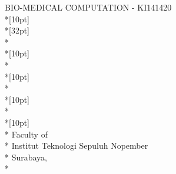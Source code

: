 \newpage

	\sffamily
	\thispagestyle{empty}
	{ \noindent BIO-MEDICAL COMPUTATION - KI141420 }\\*[10pt] 
	{\large\textbf{\MakeUppercase{\judul}}} \\*[32pt]
	\MakeUppercase{\penulisSatu} \\*
	\nrpSatu \\*[10pt]
	\MakeUppercase{\penulisDua} \\*
	\nrpDua \\*[10pt]
	\MakeUppercase{\penulisTiga} \\*
	\nrpTiga \\*[10pt]
	\MakeUppercase{\penulisEmpat} \\*
	\nrpEmpat \\*[10pt]
	\MakeUppercase{\jurusan} \\*
	Faculty of \fakultas \\*
	Institut Teknologi Sepuluh Nopember \\*
	Surabaya, \tahun \\*
	\rmfamily
	\normalsize
	\restoregeometry
	\color{black}
	\cleardoublepage
